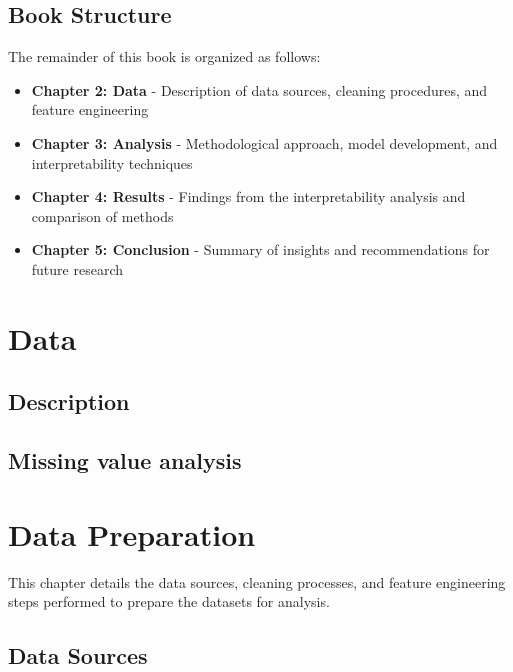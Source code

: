 \documentclass[
  letterpaper,
  DIV=11,
  numbers=noendperiod]{scrreprt}
\providecommand{\tightlist}{%
  \setlength{\itemsep}{0pt}\setlength{\parskip}{0pt}}\usepackage{longtable,booktabs,array}
\begin{document}
\section{Book Structure}\label{book-structure}

The remainder of this book is organized as follows:

\begin{itemize}
\tightlist
\item
  \textbf{Chapter 2: Data} - Description of data sources, cleaning
  procedures, and feature engineering
\item
  \textbf{Chapter 3: Analysis} - Methodological approach, model
  development, and interpretability techniques
\item
  \textbf{Chapter 4: Results} - Findings from the interpretability
  analysis and comparison of methods
\item
  \textbf{Chapter 5: Conclusion} - Summary of insights and
  recommendations for future research
\end{itemize}


\chapter{Data}\label{data}

\section{Description}\label{description}

\section{Missing value analysis}\label{missing-value-analysis}


\chapter{Data Preparation}\label{data-preparation}

This chapter details the data sources, cleaning processes, and feature
engineering steps performed to prepare the datasets for analysis.

\section{Data Sources}\label{data-sources-1}
\end{document}
